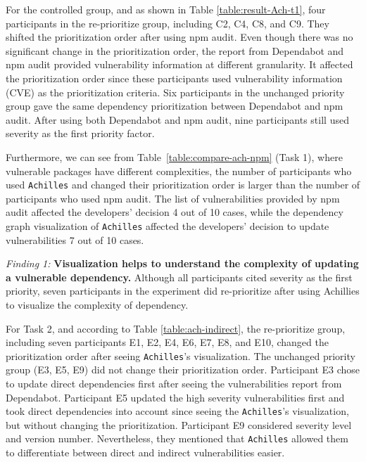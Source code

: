 \documentclass[conference]{IEEEtran}
\begin{document}
For the controlled group, and 
 as shown in Table \ref{table:result-Ach-t1}, four participants in the re-prioritize group, including C2, C4, C8, and C9. They shifted the prioritization order after using npm audit. Even though there was no significant change in the prioritization order, the report from Dependabot and npm audit provided vulnerability information at different granularity. It affected the prioritization order since these participants used vulnerability information (CVE) as the prioritization criteria. Six participants in the unchanged priority group gave the same dependency prioritization between Dependabot and npm audit.
After using both Dependabot and npm audit, nine participants still used severity as the first priority factor.	

Furthermore, we can see from Table~\ref{table:compare-ach-npm} (Task 1), where vulnerable packages have different complexities, the number of participants who used \texttt{Achilles} and changed their prioritization order is larger than the number of participants who used npm audit. The list of vulnerabilities provided by npm audit affected the developers' decision 4 out of 10 cases, while the dependency graph visualization of \texttt{Achilles} affected the developers' decision to update vulnerabilities 7 out of 10 cases. 
	
\begin{tcolorbox}
    \textit{Finding 1:} \textbf{Visualization helps to understand the complexity of updating a vulnerable dependency.} Although all participants cited severity as the first priority, seven participants in the experiment did re-prioritize after using Achillies to visualize the complexity of dependency.
\end{tcolorbox}
	
	For Task 2, and according to Table \ref{table:ach-indirect},
	the re-prioritize group, including seven participants E1, E2, E4, E6, E7, E8, and E10, changed the prioritization order after seeing \texttt{Achilles}'s visualization.  	
	The unchanged priority group (E3, E5, E9) did not change their prioritization order. Participant E3 chose to update direct dependencies first after seeing the vulnerabilities report from Dependabot. Participant E5 updated the high severity vulnerabilities first and took direct dependencies into account since seeing the \texttt{Achilles}'s visualization, but without changing the prioritization. Participant E9 considered severity level and version number. Nevertheless, they mentioned that \texttt{Achilles} allowed them to differentiate between direct and indirect vulnerabilities easier.
	
\end{document}
